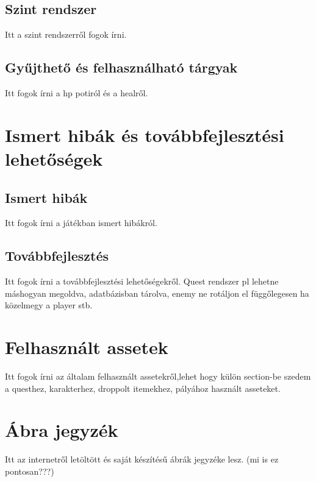\documentclass[]{thesis-ekf}
\begin{document}
\section{Szint rendszer}
Itt a szint rendszerről fogok írni.
\section{Gyűjthető és felhasználható tárgyak}
Itt fogok írni a hp potiról és a healről.

\chapter{Ismert hibák és továbbfejlesztési lehetőségek}
\section{Ismert hibák}
Itt fogok írni a játékban ismert hibákról.
\section{Továbbfejlesztés}
Itt fogok írni a továbbfejlesztési lehetőségekről. Quest rendszer pl lehetne máshogyan megoldva, adatbázisban tárolva, enemy ne rotáljon el függőlegesen ha közelmegy a player stb.

\chapter{Felhasznált assetek}
Itt fogok írni az általam felhasznált assetekről,lehet hogy külön section-be szedem a questhez, karakterhez, droppolt itemekhez, pályához használt asseteket.

\chapter{Ábra jegyzék}
Itt az internetről letöltött és saját készítésű ábrák jegyzéke lesz. (mi is ez pontosan???)


\begin{thebibliography}{2}
\end{thebibliography}
\end{document}
